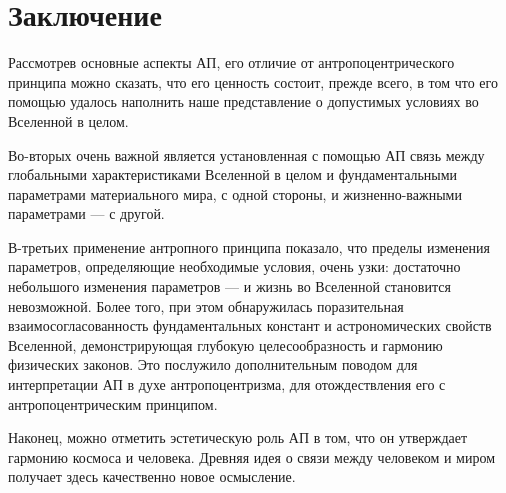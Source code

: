 \chapter*{Заключение}						%


Рассмотрев основные аспекты АП, его отличие от антропоцентрического принципа можно сказать, что его ценность состоит, прежде всего, в том что его помощью удалось наполнить наше представление о допустимых условиях во Вселенной в целом.


Во-вторых очень важной является установленная с помощью АП связь между глобальными характеристиками Вселенной в целом и фундаментальными параметрами материального мира, с одной стороны, и жизненно-важными параметрами --- с другой. 


В-третьих применение антропного принципа показало, что пределы изменения параметров, определяющие необходимые условия, очень узки: достаточно небольшого изменения параметров --- и жизнь во Вселенной становится невозможной. Более того, при этом обнаружилась поразительная взаимосогласованность фундаментальных констант и астрономических свойств Вселенной, демонстрирующая глубокую целесообразность и гармонию физических законов. Это послужило дополнительным поводом для интерпретации АП в духе антропоцентризма, для отождествления его с антропоцентрическим принципом.


Наконец, можно отметить эстетическую роль АП в том, что он утверждает гармонию космоса и человека. Древняя идея о связи между человеком и миром получает здесь качественно новое осмысление.


\clearpage